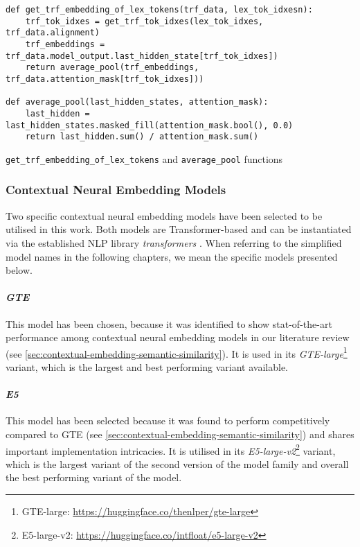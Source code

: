 \documentclass[11pt, numbers=noenddot]{scrreprt}
\let\cite\parencite  %
\begin{document}

\begin{pseudo}[p!]
\begin{lstlisting}
def get_trf_embedding_of_lex_tokens(trf_data, lex_tok_idxesn):
    trf_tok_idxes = get_trf_tok_idxes(lex_tok_idxes, trf_data.alignment)
    trf_embeddings = trf_data.model_output.last_hidden_state[trf_tok_idxes])
    return average_pool(trf_embeddings, trf_data.attention_mask[trf_tok_idxes]))

def average_pool(last_hidden_states, attention_mask):
    last_hidden = last_hidden_states.masked_fill(attention_mask.bool(), 0.0)
    return last_hidden.sum() / attention_mask.sum()
\end{lstlisting}
\caption{\texttt{get\_trf\_embedding\_of\_lex\_tokens} and \texttt{average\_pool} functions}
\label{psd:get-mebedding-subfunction}
\end{pseudo}



\subsubsection{Contextual Neural Embedding Models}
Two specific contextual neural embedding models have been selected to be utilised in this work. Both models are Transformer-based and can be instantiated via the established NLP library \textit{transformers} \cite{wolfTransformersStateoftheArtNatural2020}. When referring to the simplified model names in the following chapters, we mean the specific models presented below.

\paragraph{\textit{GTE}} This model has been chosen, because it was identified to show stat-of-the-art performance among contextual neural embedding models in our literature review (see \cref{sec:contextual-embedding-semantic-similarity}). It is used in its \textit{GTE-large}\footnote{GTE-large: \url{https://huggingface.co/thenlper/gte-large}} variant, which is the largest and best performing variant available.

\paragraph{\textit{E5}} This model has been selected because it was found to perform competitively compared to GTE (see \cref{sec:contextual-embedding-semantic-similarity}) and shares important implementation intricacies. It is utilised in its \textit{E5-large-v2}\footnote{E5-large-v2: \url{https://huggingface.co/intfloat/e5-large-v2}} variant, which is the largest variant of the second version of the model family and overall the best performing variant of the model.
\end{document}
